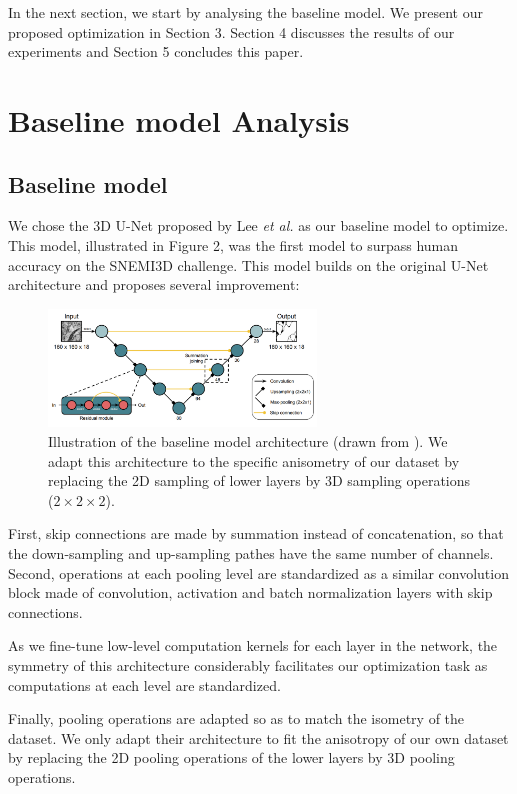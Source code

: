\documentclass[runningheads]{llncs}
\begin{document}
In the next section, we start by analysing the baseline model. 
We present our proposed optimization in Section 3. 
Section 4 discusses the results of our experiments and Section 5 concludes this paper.

\section{Baseline model Analysis}

\subsection{Baseline model}

We chose the 3D U-Net proposed by Lee \textit{et al.} \cite{lee2017superhuman} as our baseline model to optimize.
This model, illustrated in Figure 2, was the first model to surpass human accuracy on the SNEMI3D challenge.
This model builds on the original U-Net architecture \cite{ronneberger2015u} and proposes several improvement:

\begin{figure}[h]
\centering
\includegraphics[width=2.8in]{Architecture.png}
\caption{
Illustration of the baseline model architecture (drawn from \cite{lee2017superhuman}). 
We adapt this architecture to the specific anisometry of our dataset 
by replacing the 2D sampling of lower layers by 3D sampling operations ($2 \times 2 \times 2$).
}
\end{figure}

First, skip connections are made by summation instead of concatenation,
so that the down-sampling and up-sampling pathes have the same number of channels.
Second, operations at each pooling level are standardized as a similar convolution block made of 
convolution, activation and batch normalization layers with skip connections.

As we fine-tune low-level computation kernels for each layer in the network,
the symmetry of this architecture considerably facilitates our optimization task
as computations at each level are standardized.

Finally, pooling operations are adapted so as to match the isometry of the dataset.
We only adapt their architecture to fit the anisotropy of our own dataset by 
replacing the 2D pooling operations of the lower layers by 3D pooling operations.
\end{document}
